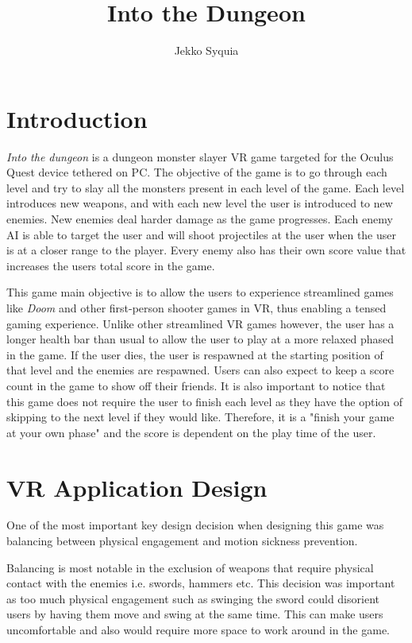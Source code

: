 \documentclass[12pt, twoside]{article}
\title{Into the Dungeon}
\author{Jekko Syquia}
\begin{document}
\maketitle
\titlepage

\tableofcontents
\newpage


\section{Introduction}

\emph{Into the dungeon} is a dungeon monster slayer VR game targeted for the
Oculus Quest device tethered on PC. The objective of the game is to go through
each level and try to slay all the monsters present in each level of the game.
Each level introduces new weapons, and with each new level the user is
introduced to new enemies. New enemies deal harder damage as the game
progresses. Each enemy AI is able to target the user and will shoot projectiles
at the user when the user is at a closer range to the player. Every enemy also
has their own score value that increases the users total score in the game. \par

This game main objective is to allow the users to experience streamlined games
like \emph{Doom} and other first-person shooter games in VR, thus enabling a
tensed gaming experience. Unlike other streamlined VR games however, the user
has a longer health bar than usual to allow the user to play at a more relaxed
phased in the game. If the user dies, the user is respawned at the starting
position of that level and the enemies are respawned. Users can also expect to
keep a score count in the game to show off their friends. It is also important
to notice that this game does not require the user to finish each level as they
have the option of skipping to the next level if they would like. Therefore, it
is a "finish your game at your own phase" and the score is dependent on the play
time of the user.
\newpage

\section{VR Application Design}
One of the most important key design decision when designing this game was
balancing between physical engagement and motion sickness prevention. \par 

Balancing is most notable in the exclusion of weapons that require physical
contact with the enemies i.e. swords, hammers etc. This decision was important
as too much physical engagement such as swinging the sword could disorient users
by having them move and swing at the same time. This can make users
uncomfortable and also would require more space to work around in the game.\par
\end{document}

